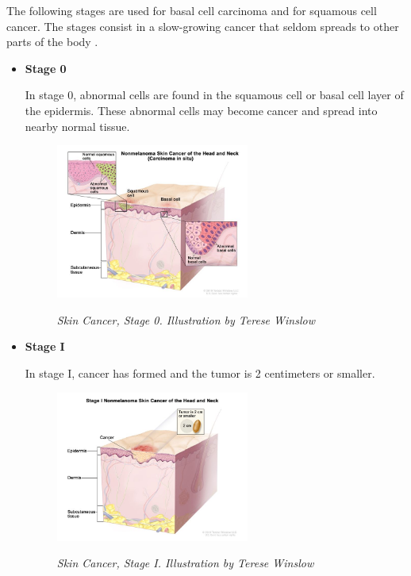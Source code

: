 The following stages are used for basal cell carcinoma and for squamous cell
cancer. The stages consist in a slow-growing cancer that seldom spreads to
other parts of the body \cite{CancerInstitute}. \\

\begin{itemize}

  \item \textbf{Stage 0}

    In stage 0, abnormal cells are found in the squamous cell or basal cell
    layer of the epidermis. These abnormal cells may become cancer and spread
    into nearby normal tissue.

    \begin{figure}[H] \centering
      \includegraphics[width=0.6\textwidth]{imatges/problem_domain/phase0-skin-cancer.jpg}
      \caption[Skin Cancer, Stage 0]{\textit{Skin Cancer, Stage 0. Illustration by Terese Winslow}}
    {\label{fig:stage0-skin-canceer}} \end{figure}

    \newpage


  \item \textbf{Stage I}

    In stage I, cancer has formed and the tumor is 2 centimeters or smaller.

    \begin{figure}[H] \centering
      \includegraphics[width=0.6\textwidth]{imatges/problem_domain/stage1-skin-cancer.jpg}
      \caption[Skin Cancer, Stage I]{\textit{Skin Cancer, Stage I.
      Illustration by Terese Winslow}} {\label{fig:stage1-skin-canceer}}
    \end{figure}



\end{itemize}
